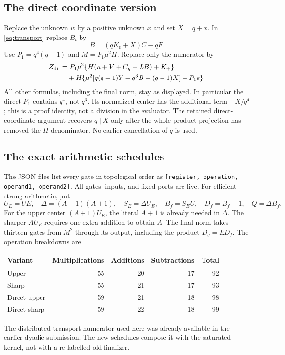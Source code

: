 \documentclass[11pt,letterpaper]{article}
\theoremstyle{remark}\newtheorem{remark}[theorem]{Remark}
\begin{document}
\subsection{The direct coordinate version}

Replace the unknown $w$ by a positive unknown $x$ and set $X=q+x$.
In \eqref{eq:transport} replace $B_t$ by
\[
 B=(qK_0+X)C-qF.
\]
Use $P_1=q^4(q-1)$ and $M=P_1\mu^2H$.  Replace only the numerator by
\begin{align}
 Z_{\rm dir}
 &=P_1\mu^2\{H(n+V+C_g-LB)+K_+\}\nonumber\\
 &\quad+H\{\mu^2[q(q-1)Y-q^3B-(q-1)X]-P_1e\}.
 \label{eq:directnumerator}
\end{align}
All other formulas, including the final norm, stay as displayed.
In particular the direct $P_1$ contains $q^4$, not $q^3$.
Its normalized center has the additional term $-X/q^4$; this is a proof
identity, not a division in the evaluator.  The retained direct-coordinate
argument recovers $q\mid X$ only after the whole-product projection has
removed the $H$ denominator.  No earlier cancellation of $q$ is used.

\subsection{The exact arithmetic schedules}

The JSON files list every gate in topological order as
\texttt{[register, operation, operand1, operand2]}.  All gates, inputs,
and fixed ports are live.  For efficient strong arithmetic, put
\[
 U_E=UE,\quad \Delta=(A-1)(A+1),\quad
 S_E=\Delta U_E,\quad B_f=S_EU,
 \quad D_f=B_f+1,\quad Q=\Delta B_f.
\]
For the upper center $(A+1)U_E$, the literal $A+1$ is already needed in
$\Delta$.  The sharper $AU_E$ requires one extra addition to obtain $A$.
The final norm takes thirteen gates from $M^2$ through its output,
including the product $D_g=ED_f$.  The operation breakdowns are
\begin{center}
\begin{tabular}{@{}lrrrr@{}}\toprule
Variant & Multiplications & Additions & Subtractions & Total\\\midrule
Upper &55&20&17&92\\
Sharp &55&21&17&93\\
Direct upper &59&21&18&98\\
Direct sharp &59&22&18&99\\\bottomrule
\end{tabular}
\end{center}
The distributed transport numerator used here was already available in
the earlier dyadic submission.  The new schedules compose it with the
saturated kernel, not with a re-labelled old finalizer.
\end{document}

